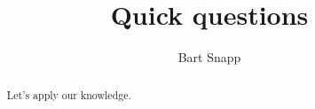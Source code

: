 \documentclass[handout,nooutcomes,noauthor]{ximera}
\title{Quick questions}
\author{Bart Snapp}
\begin{document}
\begin{abstract}
  Let's apply our knowledge.
\end{abstract}
\maketitle


\begin{listOutcomes}
\item 
\end{listOutcomes}


\mynewpage





\begin{question}
  
\end{question}

\mynewpage


\begin{question}
  
\end{question}

\mynewpage


\begin{question}
  
\end{question}
\end{document}
